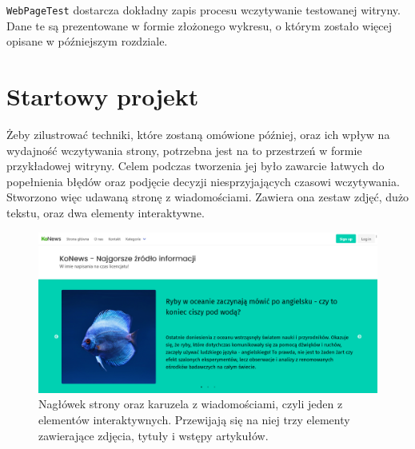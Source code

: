 \documentclass[licencjacka]{pracadypl}
\begin{document}
\texttt{WebPageTest} dostarcza dokładny zapis procesu wczytywanie testowanej witryny. Dane te są prezentowane w formie złożonego wykresu, o którym zostało więcej opisane w późniejszym rozdziale.


\section{Startowy projekt}
Żeby zilustrować techniki, które zostaną omówione później, oraz ich wpływ na wydajność wczytywania strony, potrzebna jest na to przestrzeń w formie przykładowej witryny. Celem podczas tworzenia jej było zawarcie łatwych do popełnienia błędów oraz podjęcie decyzji niesprzyjających czasowi wczytywania. Stworzono więc udawaną stronę z wiadomościami. Zawiera ona zestaw zdjęć, dużo tekstu, oraz dwa elementy interaktywne. 

\begin{figure}[H]
  \includegraphics[width=\linewidth]{images/frontpage.png}
  \caption{Nagłówek strony oraz karuzela z wiadomościami, czyli jeden z elementów interaktywnych. Przewijają się na niej trzy elementy zawierające zdjęcia, tytuły i wstępy artykułów.}
  \label{fig:frontpage}
\end{figure}
\end{document}
